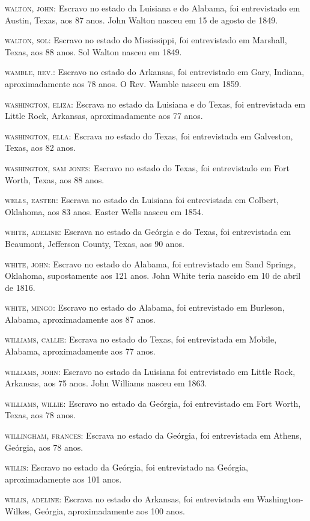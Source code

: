 \begin{Parskip}
\textsc{walton, john:} Escravo no estado da Luisiana e do Alabama, foi
entrevistado em Austin, Texas, aos 87 anos. John Walton nasceu em 15 de
agosto de 1849.

\textsc{walton, sol:} Escravo no estado do Mississippi, foi entrevistado
em Marshall, Texas, aos 88 anos. Sol Walton nasceu em 1849.

\textsc{wamble, rev.:} Escravo no estado do Arkansas, foi entrevistado
em Gary, Indiana, aproximadamente aos 78 anos. O Rev. Wamble nasceu em
1859.

\textsc{washington, eliza:} Escrava no estado da Luisiana e do Texas,
foi entrevistada em Little Rock, Arkansas, aproximadamente aos 77 anos.

\textsc{washington, ella:} Escrava no estado do Texas, foi entrevistada
em Galveston, Texas, aos 82 anos.

\textsc{washington, sam jones:} Escravo no estado do Texas, foi
entrevistado em Fort Worth, Texas, aos 88 anos.

\textsc{wells, easter:} Escrava no estado da Luisiana foi entrevistada
em Colbert, Oklahoma, aos 83 anos. Easter Wells nasceu em 1854.

\textsc{white, adeline:} Escrava no estado da Geórgia e do Texas, foi
entrevistada em Beaumont, Jefferson County, Texas, aos 90 anos.

\textsc{white, john:} Escravo no estado do Alabama, foi entrevistado em
Sand Springs, Oklahoma, supostamente aos 121 anos. John White teria
nascido em 10 de abril de 1816.

\textsc{white, mingo:} Escravo no estado do Alabama, foi entrevistado em
Burleson, Alabama, aproximadamente aos 87 anos.

\textsc{williams, callie:} Escrava no estado do Texas, foi entrevistada
em Mobile, Alabama, aproximadamente aos 77 anos.

\textsc{williams, john:} Escravo no estado da Luisiana foi entrevistado
em Little Rock, Arkansas, aos 75 anos. John Williams nasceu em 1863.

\textsc{williams, willie:} Escravo no estado da Geórgia, foi
entrevistado em Fort Worth, Texas, aos 78 anos.

\textsc{willingham, frances:} Escrava no estado da Geórgia, foi
entrevistada em Athens, Geórgia, aos 78 anos.

\textsc{willis:} Escravo no estado da Geórgia, foi entrevistado na
Geórgia, aproximadamente aos 101 anos.

\textsc{willis, adeline:} Escrava no estado do Arkansas, foi
entrevistada em Washington-Wilkes, Geórgia, aproximadamente aos 100
anos.


\end{Parskip}
